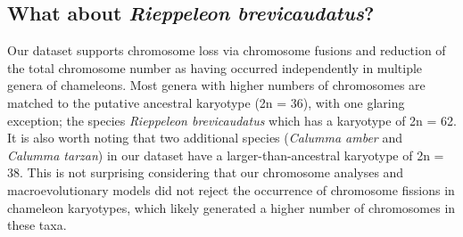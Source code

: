 \documentclass[a4paper, 12pt]{article}
\begin{document}
\subsection{What about \textit{Rieppeleon brevicaudatus}?}
Our dataset supports chromosome loss via chromosome fusions and reduction of the total chromosome number as having occurred independently in multiple genera of chameleons. 
Most genera with higher numbers of chromosomes are matched to the putative ancestral karyotype (2n = 36), with one glaring exception; the species \textit{Rieppeleon brevicaudatus} which has a karyotype of 2n = 62. 
It is also worth noting that two additional species (\textit{Calumma amber} and \textit{Calumma tarzan}) in our dataset have a larger-than-ancestral karyotype of 2n = 38. 
This is not surprising considering that our chromosome analyses and macroevolutionary models did not reject the occurrence of chromosome fissions in chameleon karyotypes, which likely generated a higher number of chromosomes in these taxa.
\end{document}

